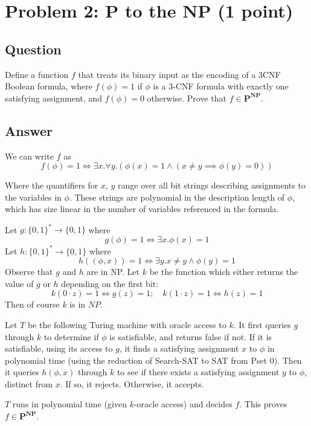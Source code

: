 \documentclass{article}
\renewcommand{\P}{\mathbf{P}}
\newcommand{\NP}{\mathbf{NP}}
\begin{document}
\section*{Problem 2: P to the NP (1 point)}

\subsection*{Question}

Define a function $f$ that treats its binary input as the encoding of a 3CNF Boolean formula, where $f(\phi) = 1$ if $\phi$ is a 3-CNF formula with exactly one satisfying assignment, and $f(\phi) = 0$ otherwise. Prove that $f \in \P^{\NP}$.

\subsection*{Answer}

We can write $f$ as
$$
	f(\phi) = 1 \iff \exists x . \forall y . (\phi(x) = 1 \wedge (x \neq y \implies \phi(y) = 0))
$$

Where the quantifiers for $x$, $y$ range over all bit strings describing assignments to the variables in $\phi$.  These strings are polynomial in the description length of $\phi$, which has size linear in the number of variables referenced in the formula. 

Let $g : \{0, 1\}^* \to \{0, 1\}$ where
$$
g(\phi) = 1 \iff \exists x . \phi(x) = 1
$$
Let $h : \{0, 1\}^* \to \{0, 1\}$ where
$$
h((\phi, x)) = 1 \iff \exists y . x \neq y \wedge \phi(y) = 1
$$
Observe that $g$ and $h$ are in NP.
Let $k$ be the function which either returns the value of $g$ or $h$ depending on the first bit:
$$
k(0 \cdot z) = 1 \iff g(z) = 1 ; \quad k(1 \cdot z) = 1 \iff h(z) = 1
$$
Then of course $k$ is in $NP$.

Let $T$ be the following Turing machine with oracle access to $k$.  It first queries $g$ through $k$ to determine if $\phi$ is satisfiable, and returns false if not.  If it is satisfiable, using its access to $g$, it finds a satisfying assignment $x$ to $\phi$ in polynomial time (using the reduction of Search-SAT to SAT from Pset 0).  Then it queries $h(\phi, x)$ through $k$ to see if there exists a satisfying assignment $y$ to $\phi$, distinct from $x$.  If so, it rejects.  Otherwise, it accepts.

$T$ runs in polynomial time (given $k$-oracle access) and decides $f$.
This proves $f \in \P^\NP$.


\end{document}
